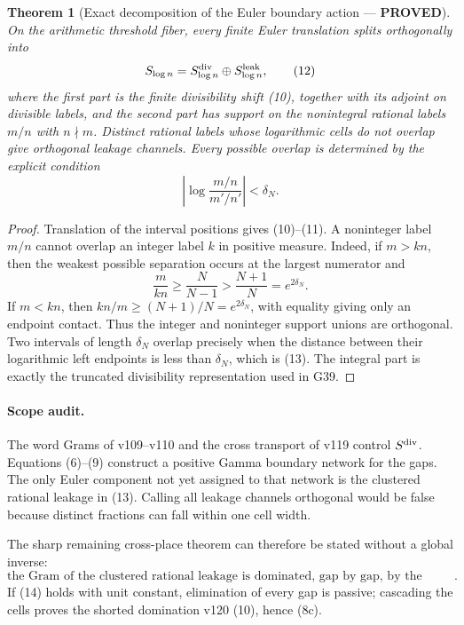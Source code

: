 \documentclass[11pt]{article}
\newcommand{\PROVED}{\textcolor{green!40!black}{\textbf{PROVED}}}
\newtheorem{theorem}{Theorem}
\begin{document}
\begin{theorem}[Exact decomposition of the Euler boundary action ---
\PROVED]
On the arithmetic threshold fiber, every finite Euler translation splits
orthogonally into
\begin{equation}
 S_{\log n}=S_{\log n}^{\rm div}\oplus S_{\log n}^{\rm leak},\tag{12}
\end{equation}
where the first part is the finite divisibility shift (10), together with
its adjoint on divisible labels, and the second part has support on the
nonintegral rational labels $m/n$ with $n\nmid m$.  Distinct rational
labels whose logarithmic cells do not overlap give orthogonal leakage
channels.  Every possible overlap is determined by the explicit condition
\begin{equation}
 \left|\log\frac{m/n}{m'/n'}\right|<\delta_N.                 \tag{13}
\end{equation}
\end{theorem}

\begin{proof}
Translation of the interval positions gives (10)--(11).  A noninteger
label $m/n$ cannot overlap an integer label $k$ in positive measure.
Indeed, if $m>kn$, then the weakest possible separation occurs at the
largest numerator and
\[
 \frac{m}{kn}\ge\frac{N}{N-1}>\frac{N+1}{N}=e^{2\delta_N}.
\]
If $m<kn$, then $kn/m\ge(N+1)/N=e^{2\delta_N}$, with equality
giving only an endpoint contact.  Thus the integer and noninteger support
unions are orthogonal.  Two intervals of length $\delta_N$ overlap
precisely when the distance between their logarithmic left endpoints is
less than $\delta_N$, which is (13).  The integral part is exactly the
truncated divisibility representation used in G39.
\end{proof}

\paragraph{Scope audit.}
The word Grams of v109--v110 and the cross transport of v119 control
$S^{\rm div}$.  Equations (6)--(9) construct a positive Gamma boundary
network for the gaps.  The only Euler component not yet assigned to that
network is the clustered rational leakage in (13).  Calling all leakage
channels orthogonal would be false because distinct fractions can fall
within one cell width.

The sharp remaining cross-place theorem can therefore be stated without a
global inverse:
\begin{equation}
 \boxed{\text{the Gram of the clustered rational leakage is dominated,
 gap by gap, by the Gamma resistance (9) plus the Tate terminal of v117}.}
                                                                    \tag{14}
\end{equation}
If (14) holds with unit constant, elimination of every gap is passive;
cascading the cells proves the shorted domination v120 (10), hence (8c).
\end{document}
